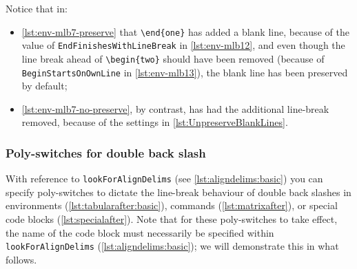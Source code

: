 
		Notice that in:
		\begin{itemize}
			\item \cref{lst:env-mlb7-preserve} that \lstinline!\end{one}! has added a blank line,
			      because of the value of \texttt{EndFinishesWithLineBreak} in \vref{lst:env-mlb12}, and
			      even though the line break ahead of \lstinline!\begin{two}! should have been removed
			      (because of \texttt{BeginStartsOnOwnLine} in \vref{lst:env-mlb13}), the blank line has
			      been preserved by default;
			\item \cref{lst:env-mlb7-no-preserve}, by contrast, has had the additional line-break removed,
			      because of the settings in \cref{lst:UnpreserveBlankLines}.
		\end{itemize}

\subsubsection{Poly-switches for double back slash}\label{subsec:dbs}
	With reference to \texttt{lookForAlignDelims} (see \vref{lst:aligndelims:basic})
	 you can specify poly-switches to
	dictate the line-break behaviour of double back slashes in environments
	(\vref{lst:tabularafter:basic}), commands (\vref{lst:matrixafter}), or special code
	blocks (\vref{lst:specialafter}). Note that for these poly-switches to take effect, the
	name of the code block must necessarily be specified within \texttt{lookForAlignDelims}
	(\vref{lst:aligndelims:basic}); we will demonstrate this in what follows.

